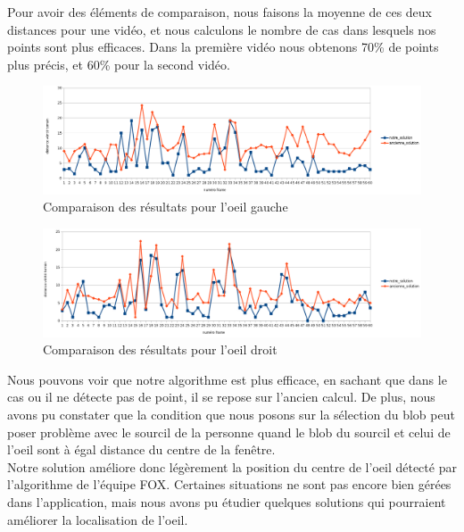 Pour avoir des éléments de comparaison, nous faisons la moyenne de ces deux distances pour une vidéo, et nous calculons
le nombre de cas dans lesquels nos points sont plus efficaces. Dans la première vidéo nous obtenons 70\% de points plus précis, et
60\% pour la second vidéo.\\

\begin{figure}[H]
  \includegraphics[width=17cm]{resultat/resultat_gauche.png}
  \caption{Comparaison des résultats pour l'oeil gauche}
\end{figure}

\begin{figure}[H]
  \includegraphics[width=17cm]{resultat/resultat_droit.png}
  \caption{Comparaison des résultats pour l'oeil droit}
\end{figure}

Nous pouvons voir que notre algorithme est plus efficace, en sachant que dans le cas ou il ne détecte pas de point, il se repose sur l'ancien
calcul. De plus, nous avons pu constater que la condition que nous posons sur la sélection du blob peut poser problème 
avec le sourcil de la personne quand le blob du sourcil et celui de l'oeil sont à égal distance du centre de la fenêtre.\\

Notre solution améliore donc légèrement la position du centre de l'oeil détecté par l'algorithme de l'équipe FOX. Certaines
situations ne sont pas encore bien gérées dans l'application, mais nous avons pu étudier quelques solutions qui pourraient améliorer
la localisation de l'oeil.

